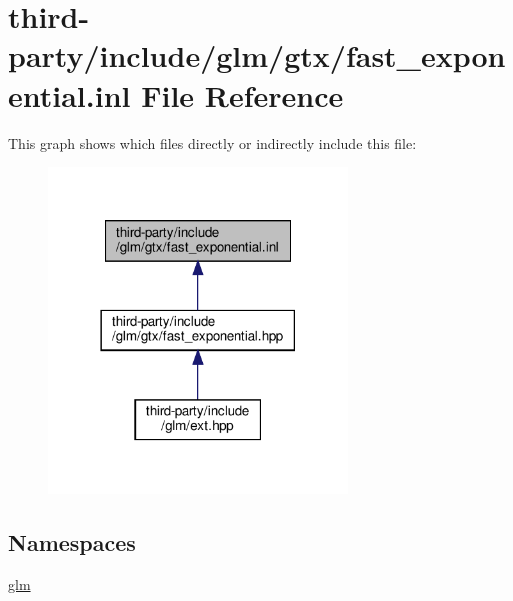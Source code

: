 \hypertarget{fast__exponential_8inl}{}\section{third-\/party/include/glm/gtx/fast\+\_\+exponential.inl File Reference}
\label{fast__exponential_8inl}
This graph shows which files directly or indirectly include this file\+:
\nopagebreak
\begin{figure}[H]
\begin{center}
\leavevmode
\includegraphics[width=225pt]{fast__exponential_8inl__dep__incl}
\end{center}
\end{figure}
\subsection*{Namespaces}
\begin{DoxyCompactItemize}
\item 
 \hyperlink{namespaceglm}{glm}
\end{DoxyCompactItemize}
